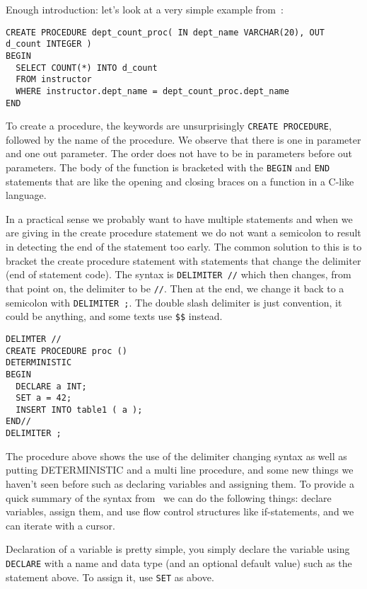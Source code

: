 \documentclass[a4paper]{report}
\begin{document}
Enough introduction: let's look at a very simple example from~\cite{dsc}:

{\small
\begin{verbatim}
CREATE PROCEDURE dept_count_proc( IN dept_name VARCHAR(20), OUT d_count INTEGER )
BEGIN
  SELECT COUNT(*) INTO d_count
  FROM instructor
  WHERE instructor.dept_name = dept_count_proc.dept_name
END
\end{verbatim}
}

To create a procedure, the keywords are unsurprisingly \texttt{CREATE PROCEDURE}, followed by the name of the procedure. We observe that there is one in parameter and one out parameter. The order does not have to be in parameters before out parameters. The body of the function is bracketed with the \texttt{BEGIN} and \texttt{END} statements that are like the opening and closing braces on a function in a C-like language.

In a practical sense we probably want to have multiple statements and when we are giving in the create procedure statement we do not want a semicolon to result in detecting the end of the statement too early. The common solution to this is to bracket the create procedure statement with statements that change the delimiter (end of statement code). The syntax is \texttt{DELIMITER //} which then changes, from that point on, the delimiter to be \texttt{//}. Then at the end, we change it back to a semicolon with \texttt{DELIMITER ;}. The double slash delimiter is just convention, it could be anything, and some texts use \texttt{\$\$} instead.

{\small
\begin{verbatim}
DELIMTER //
CREATE PROCEDURE proc () 
DETERMINISTIC
BEGIN
  DECLARE a INT;
  SET a = 42;
  INSERT INTO table1 ( a );
END//
DELIMITER ;
\end{verbatim}
}

The procedure above shows the use of the delimiter changing syntax as well as putting DETERMINISTIC and a multi line procedure, and some new things we haven't seen before such as declaring variables and assigning them. To provide a quick summary of the syntax from~\cite{storedproc} we can do the following things: declare variables, assign them, and use flow control structures like if-statements, and we can iterate with a cursor.

Declaration of a variable is pretty simple, you simply declare the variable using \texttt{DECLARE} with a name and data type (and an optional default value) such as the statement above. To assign it, use \texttt{SET} as above. 
\end{document}
